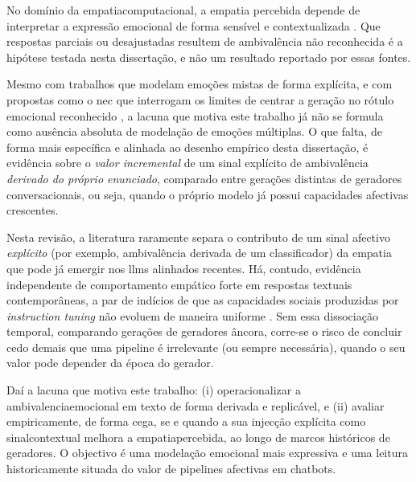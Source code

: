 No domínio da \gls{empatiacomputacional}, a empatia percebida depende de interpretar a expressão emocional de forma sensível e contextualizada \parencite{Rashkin2019Empathy, Sharma2020Empathy}. Que respostas parciais ou desajustadas resultem de ambivalência não reconhecida é a hipótese testada nesta dissertação, e não um resultado reportado por essas fontes.

Mesmo com trabalhos que modelam emoções mistas de forma explícita, e com propostas como o \gls{nec} que interrogam os limites de centrar a geração no rótulo emocional reconhecido \parencite{Zhao2026MEGE, Huangfu2025NEC}, a lacuna que motiva este trabalho já não se formula como ausência absoluta de modelação de emoções múltiplas. O que falta, de forma mais específica e alinhada ao desenho empírico desta dissertação, é evidência sobre o \textit{valor incremental} de um sinal explícito de ambivalência \textit{derivado do próprio enunciado}, comparado entre gerações distintas de geradores conversacionais, ou seja, quando o próprio modelo já possui capacidades afectivas crescentes.

Nesta revisão, a literatura raramente separa o contributo de um sinal afectivo \textit{explícito} (por exemplo, ambivalência derivada de um classificador) da empatia que pode já emergir nos \glspl{llm} alinhados recentes. Há, contudo, evidência independente de comportamento empático forte em respostas textuais contemporâneas, a par de indícios de que as capacidades sociais produzidas por \textit{instruction tuning} não evoluem de maneira uniforme \parencite{Welivita2026HumansOrLLMs, Ou2024DialogBench}. Sem essa dissociação temporal, comparando gerações de geradores âncora, corre-se o risco de concluir cedo demais que uma pipeline é irrelevante (ou sempre necessária), quando o seu valor pode depender da época do gerador.

Daí a lacuna que motiva este trabalho: (i) operacionalizar a \gls{ambivalenciaemocional} em texto de forma derivada e replicável, e (ii) avaliar empiricamente, de forma cega, se e quando a sua injecção explícita como \gls{sinalcontextual} melhora a \gls{empatiapercebida}, ao longo de marcos históricos de geradores. O objectivo é uma modelação emocional mais expressiva e uma leitura historicamente situada do valor de pipelines afectivas em chatbots.


